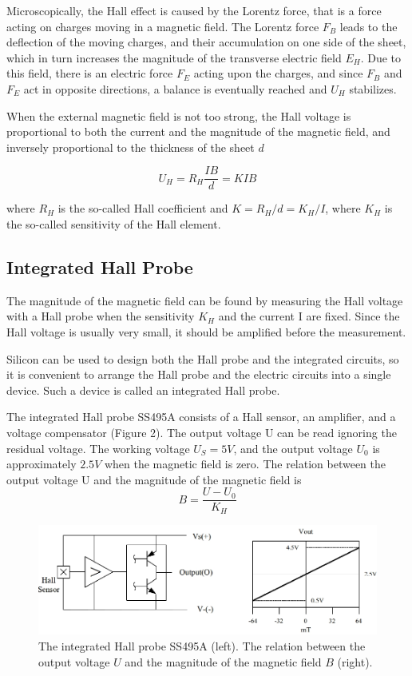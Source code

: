 \documentclass{article}
\begin{document}
Microscopically, the Hall effect is caused by the Lorentz force, that is a force acting on charges moving in a magnetic field. The Lorentz force $ F_B $ leads to the deflection of the moving charges, and their accumulation on one side of the sheet, which in turn increases the magnitude of the transverse electric field $ E_H $. Due to this field, there is an electric force $ F_E $ acting upon the charges, and since $ F_B $ and $ F_E $ act in opposite directions, a balance is eventually reached and $ U_H $ stabilizes.

When the external magnetic field is not too strong, the Hall voltage is proportional to both the current and the magnitude of the magnetic field, and inversely proportional to the thickness of the sheet $ d $

\begin{equation}
U_H=R_H\dfrac{IB}{d}=KIB
\end{equation}


where $ R_H $ is the so-called Hall coefficient and $ K=R_H/d=K_H/I $, where $ K_H $ is the so-called sensitivity of the Hall element.

\subsection{Integrated Hall Probe}
The magnitude of the magnetic field can be found by measuring the Hall voltage with a Hall probe when the sensitivity $ K_H $ and the current I are fixed. Since the Hall voltage is usually very small, it should be amplified before the measurement.

Silicon can be used to design both the Hall probe and the integrated circuits, so it is convenient to arrange the Hall probe and the electric circuits into a single device. Such a device is called an integrated Hall probe.

The integrated Hall probe SS495A consists of a Hall sensor, an amplifier, and a voltage compensator (Figure 2). The output voltage U can be read ignoring the residual voltage. The working voltage $ U_S = 5 V $, and the output voltage $ U_0 $ is approximately $ 2.5 V $ when the magnetic field is zero. The relation between the output voltage U and the magnitude of the magnetic field is
\begin{equation}
	B=\dfrac{U-U_0}{K_H}
\end{equation}
\begin{figure}[H]
	\centering
	\includegraphics[scale=0.6]{p2.png}
	\caption{The integrated Hall probe SS495A (left). The relation between the output voltage $ U $ and the magnitude of the magnetic field $ B $ (right).}
\end{figure}
\end{document}
